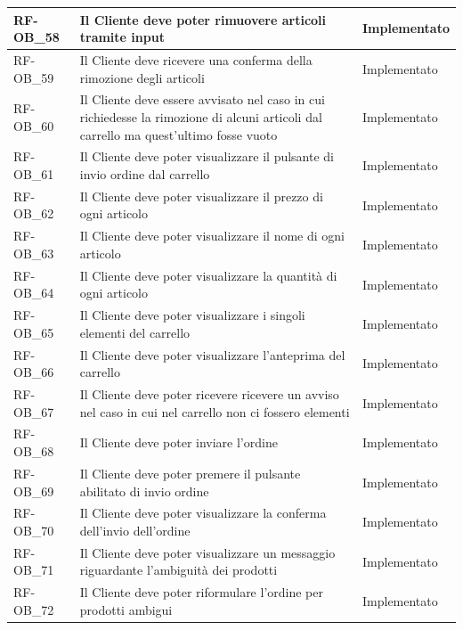 \begin{longtable}{|>{\raggedright}p{}|>{\raggedright\arraybackslash}p{}|>{\raggedright\arraybackslash}p{}|}
	\hline
	RF-OB\_58 \hypertarget{rf-ob_58} & Il Cliente deve poter rimuovere articoli tramite input & Implementato \\
	\hline
	RF-OB\_59 \hypertarget{rf-ob_59} & Il Cliente deve ricevere una conferma della rimozione degli articoli & Implementato \\
	\hline
	RF-OB\_60 \hypertarget{rf-ob_60} & Il Cliente deve essere avvisato nel caso in cui richiedesse la rimozione di alcuni articoli dal carrello ma quest'ultimo fosse vuoto & Implementato \\
	\hline
	RF-OB\_61 \hypertarget{rf-ob_61} & Il Cliente deve poter visualizzare il pulsante di invio ordine dal carrello & Implementato \\
	\hline
	RF-OB\_62 \hypertarget{rf-ob_62} & Il Cliente deve poter visualizzare il prezzo di ogni articolo & Implementato \\
	\hline
	RF-OB\_63 \hypertarget{rf-ob_63} & Il Cliente deve poter visualizzare il nome di ogni articolo & Implementato \\
	\hline
	RF-OB\_64 \hypertarget{rf-ob_64} & Il Cliente deve poter visualizzare la quantità di ogni articolo & Implementato \\
	\hline
	RF-OB\_65 \hypertarget{rf-ob_65} & Il Cliente deve poter visualizzare i singoli elementi del carrello & Implementato \\
	\hline
	RF-OB\_66 \hypertarget{rf-ob_66} & Il Cliente deve poter visualizzare l'anteprima del carrello & Implementato \\
	\hline
	RF-OB\_67 \hypertarget{rf-ob_67} & Il Cliente deve poter ricevere ricevere un avviso nel caso in cui nel carrello non ci fossero elementi & Implementato \\
	\hline
	RF-OB\_68 \hypertarget{rf-ob_68} & Il Cliente deve poter inviare l'ordine & Implementato \\
	\hline
	RF-OB\_69 \hypertarget{rf-ob_69} & Il Cliente deve poter premere il pulsante abilitato di invio ordine & Implementato \\
	\hline
	RF-OB\_70 \hypertarget{rf-ob_70} & Il Cliente deve poter visualizzare la conferma dell'invio dell'ordine & Implementato \\
	\hline
	RF-OB\_71 \hypertarget{rf-ob_71} & Il Cliente deve poter visualizzare un messaggio riguardante l'ambiguità dei prodotti & Implementato \\
	\hline
	RF-OB\_72 \hypertarget{rf-ob_72} & Il Cliente deve poter riformulare l'ordine per prodotti ambigui & Implementato \\

\end{longtable}
